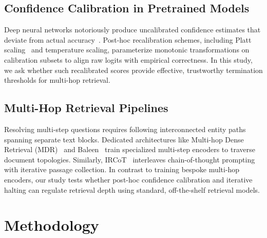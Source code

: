 \documentclass[conference]{IEEEtran}
\begin{document}
\subsection{Confidence Calibration in Pretrained Models}
Deep neural networks notoriously produce uncalibrated confidence estimates that deviate from actual accuracy~\cite{guo2017calibration}. Post-hoc recalibration schemes, including Platt scaling~\cite{platt1999probabilistic} and temperature scaling, parameterize monotonic transformations on calibration subsets to align raw logits with empirical correctness. In this study, we ask whether such recalibrated scores provide effective, trustworthy termination thresholds for multi-hop retrieval.

\subsection{Multi-Hop Retrieval Pipelines}
Resolving multi-step questions requires following interconnected entity paths spanning separate text blocks. Dedicated architectures like Multi-hop Dense Retrieval (MDR)~\cite{xiong2021mdr} and Baleen~\cite{khattab2021baleen} train specialized multi-step encoders to traverse document topologies. Similarly, IRCoT~\cite{trivedi2023ircot} interleaves chain-of-thought prompting with iterative passage collection. In contrast to training bespoke multi-hop encoders, our study tests whether post-hoc confidence calibration and iterative halting can regulate retrieval depth using standard, off-the-shelf retrieval models.


\section{Methodology}
\label{sec:method}
\end{document}
